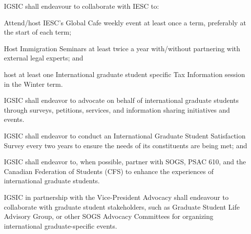 \begin{longenum}[ label*=\thesubsection.\arabic*., align=left]
\begin{longenum}[ label*=\arabic*., align=left]
	\item IGSIC shall endeavour to collaborate with IESC to:
	\begin{longenum}[ label*=\arabic*., align=left]
		\item Attend/host IESC’s Global Cafe weekly event at least once a term, preferably at the start of each term;
		\item Host Immigration Seminars at least twice a year with/without partnering with external legal experts; and
		\item host at least one International graduate student specific Tax Information session in the Winter term.
	\end{longenum}
	\item IGSIC shall endeavor to advocate on behalf of international graduate students through surveys, petitions, services, and information sharing initiatives and events.
	\begin{longenum}[ label*=\arabic*., align=left]
		\item IGSIC shall endeavor to conduct an International Graduate Student Satisfaction Survey every two years to ensure the needs of its constituents are being met; and
		\item IGSIC shall endeavor to, when possible, partner with SOGS, PSAC 610, and the Canadian Federation of Students (CFS) to enhance the experiences of international graduate students.
	\end{longenum}
	\item IGSIC in partnership with the Vice-President Advocacy shall endeavour to collaborate with graduate student stakeholders, such as Graduate Student Life Advisory Group, or other SOGS Advocacy Committees for organizing international graduate-specific events.
	\end{longenum}
\end{longenum}